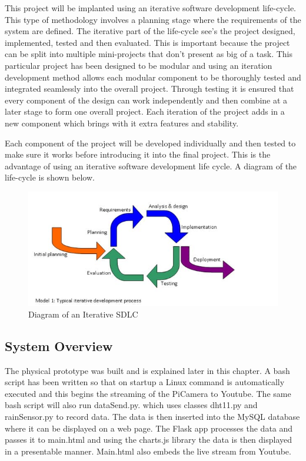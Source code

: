 \documentclass[10pt,a4paper]{article}
\begin{document}
This project will be implanted using an iterative software development life-cycle. This type of methodology involves a planning stage where the requirements of the system are defined. The iterative part of the life-cycle see's the project designed, implemented, tested and then evaluated. This is important because the project can be split into multiple mini-projects that don't present as big of a task. This particular project has been designed to be modular and using an iteration development method allows each modular component to be thoroughly tested and integrated seamlessly into the overall project. Through testing it is ensured that every component of the design can work independently and then combine at a later stage to form one overall project. Each iteration of the project adds in a new component which brings with it extra features and stability. 

Each component of the project will be developed individually and then tested to make sure it works before introducing it into the final project. This is the advantage of using an iterative software development life cycle. A diagram of the life-cycle is shown below. 

\begin{figure}[H]
  \centering
    \includegraphics[width=\linewidth]{images/iterativemodel.jpg}
    \caption{Diagram of an Iterative SDLC}
    \label{fig:iterativemodel}
\end{figure}

\subsection{System Overview}
The physical prototype was built and is explained later in this chapter. A bash script has been written so that on startup a Linux command is automatically executed and this begins the streaming of the PiCamera to Youtube. The same bash script will also run dataSend.py. which uses classes dht11.py and rainSensor.py to record data. The data is then inserted into the MySQL database where it can be displayed on a web page. The Flask app processes the data and passes it to main.html and using the charts.js library the data is then displayed in a presentable manner. Main.html also embeds the live stream from Youtube. 
\end{document}
